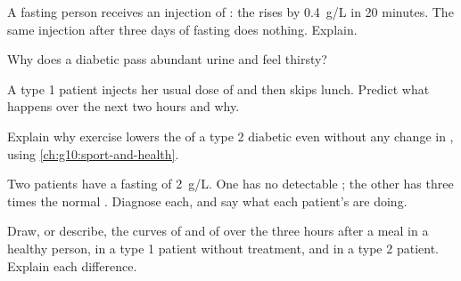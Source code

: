 \begin{exercise}[$\star\star$]\label{exo:g12:glucose-and-diabetes:8}
A fasting person receives an injection of : the 
rises by \qty{0.4}{g/L} in 20 minutes. The same injection after three
days of fasting does nothing. Explain.
\end{exercise}

\begin{exercise}[$\star\star$]\label{exo:g12:glucose-and-diabetes:9}
Why does a diabetic pass abundant urine and feel thirsty?
\end{exercise}

\begin{exercise}[$\star\star$]\label{exo:g12:glucose-and-diabetes:10}
A type 1 patient injects her usual dose of  and then skips
lunch. Predict what happens over the next two hours and why.
\end{exercise}

\begin{exercise}[$\star\star$]\label{exo:g12:glucose-and-diabetes:11}
Explain why exercise lowers the  of a type 2 diabetic even
without any change in , using \cref{ch:g10:sport-and-health}.
\end{exercise}

\begin{exercise}[$\star\star\star$]\label{exo:g12:glucose-and-diabetes:12}
Two patients have a fasting  of \qty{2}{g/L}. One has no
detectable ; the other has three times the normal .
Diagnose each, and say what each patient's  are doing.
\end{exercise}

\begin{exercise}[$\star\star\star$]\label{exo:g12:glucose-and-diabetes:13}
Draw, or describe, the curves of  and of  over the
three hours after a meal in a healthy person, in a type 1 patient
without treatment, and in a type 2 patient. Explain each difference.
\end{exercise}

